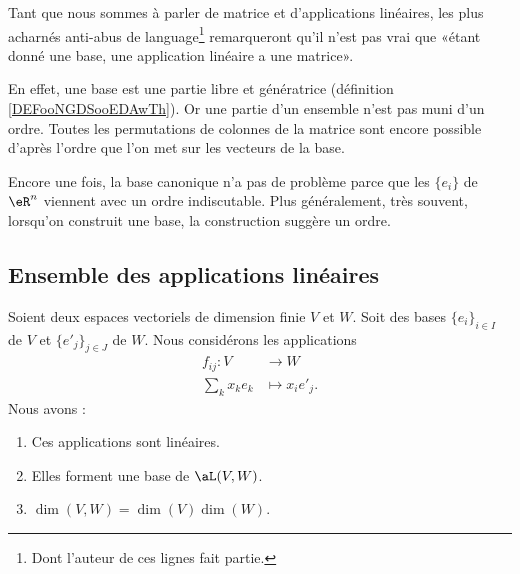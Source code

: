 \begin{normaltext}
	Tant que nous sommes à parler de matrice et d'applications linéaires, les plus acharnés anti-abus de language\footnote{Dont l'auteur de ces lignes fait partie.} remarqueront qu'il n'est pas vrai que «étant donné une base, une application linéaire a une matrice».

	En effet, une base est une partie libre et génératrice (définition \ref{DEFooNGDSooEDAwTh}). Or une partie d'un ensemble n'est pas muni d'un ordre. Toutes les permutations de colonnes de la matrice sont encore possible d'après l'ordre que l'on met sur les vecteurs de la base.

	Encore une fois, la base canonique n'a pas de problème parce que les \( \{ e_i \}\) de \( \eR^n\) viennent avec un ordre indiscutable. Plus généralement, très souvent, lorsqu'on construit une base, la construction suggère un ordre.
\end{normaltext}


\subsection{Ensemble des applications linéaires}

\begin{proposition}		\label{PROPooRIFBooGOvsfb}
	Soient deux espaces vectoriels de dimension finie \( V\) et \( W\). Soit des bases \( \{ e_i \}_{i \in I}\) de \( V\) et \( \{ e'_j \}_{j\in J}\) de \( W\). Nous considérons les applications
	\begin{equation}	\label{EQooBMKQooCCypzP}
		\begin{aligned}
			f_{ij}\colon V & \to W            \\
			\sum_kx_ke_k   & \mapsto x_ie'_j.
		\end{aligned}
	\end{equation}
	Nous avons :
	\begin{enumerate}
		\item
		      Ces applications sont linéaires.
		\item		\label{ITEMooSEMLooXuxrpk}
		      Elles forment une base de \( \aL(V,W)\).
		\item
		      \( \dim(V,W)=\dim(V)\dim(W)\).
	\end{enumerate}
\end{proposition}

